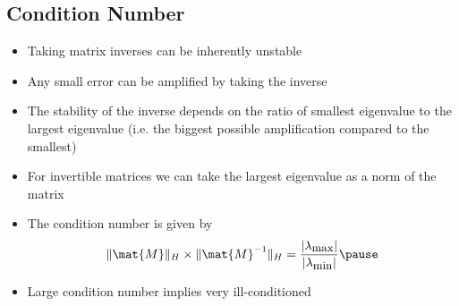 
\begin{slide}
\section[-2]{Condition Number}

\begin{PauseHighLight}
  \begin{itemize}\squeeze
  \item Taking matrix inverses can be inherently unstable\pause
  \item Any small error can be amplified by taking the inverse\pause
  \item The stability of the inverse depends on the ratio of smallest
    eigenvalue to the largest eigenvalue (i.e. the biggest possible
    amplification compared to the smallest)\pause
  \item For invertible matrices we can take the largest eigenvalue as
    a norm of the matrix\pause
  \item The condition number is given by
    \begin{align*}
      \|\mat{M}\|_H \times \|\mat{M}^{-1}\|_H =
      \frac{|\lambda_{\text{\small max}}|}{|\lambda_{\text{\small min}}|}\pause
    \end{align*}
  \item Large condition number implies very ill-conditioned\pause
  \end{itemize}
\end{PauseHighLight}

\end{slide}

\Outline %

